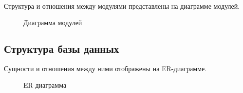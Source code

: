 Структура и отношения между модулями представлены на диаграмме модулей.
 \begin{landscape}
	\begin{figure}[ht]
		\caption{Диаграмма модулей}
		\label{modules_diagram:image}
	\end{figure}
\end{landscape}

\subsection{Структура базы данных}
Сущности и отношения между ними отображены на ER-диаграмме.
 \begin{figure}[ht]
	\caption{ER-диаграмма}
	\label{er_diagram:image}
\end{figure}

